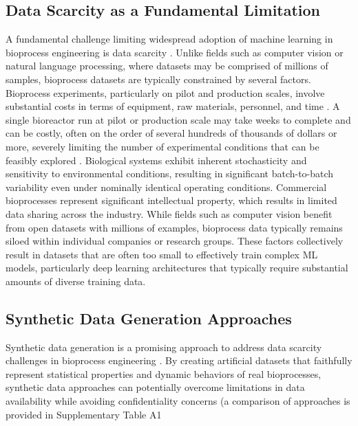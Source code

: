 \documentclass[12pt,twocolumn]{article}
\begin{document}
\subsection{Data Scarcity as a Fundamental Limitation}

A fundamental challenge limiting widespread adoption of machine learning in bioprocess engineering is data scarcity \cite{lim2023opportunities, duongtrung2023when}. Unlike fields such as computer vision or natural language processing, where datasets may be comprised of millions of samples, bioprocess datasets are typically constrained by several factors. Bioprocess experiments, particularly on pilot and production scales, involve substantial costs in terms of equipment, raw materials, personnel, and time \cite{shariatifar2025digital, exploring_hernndezromero_2025}. A single bioreactor run at pilot or production scale may take weeks to complete and can be costly, often on the order of several hundreds of thousands of dollars or more, severely limiting the number of experimental conditions that can be feasibly explored \cite{exploring_hernndezromero_2025}. Biological systems exhibit inherent stochasticity and sensitivity to environmental conditions, resulting in significant batch-to-batch variability even under nominally identical operating conditions. Commercial bioprocesses represent significant intellectual property, which results in limited data sharing across the industry. While fields such as computer vision benefit from open datasets with millions of examples, bioprocess data typically remains siloed within individual companies or research groups. These factors collectively result in datasets that are often too small to effectively train complex ML models, particularly deep learning architectures that typically require substantial amounts of diverse training data.

\subsection{Synthetic Data Generation Approaches}

Synthetic data generation is a promising approach to address data scarcity challenges in bioprocess engineering \cite{liu2024bestpracticeslessonslearned}. By creating artificial datasets that faithfully represent statistical properties and dynamic behaviors of real bioprocesses, synthetic data approaches can potentially overcome limitations in data availability while avoiding confidentiality concerns (a comparison of approaches is provided in Supplementary Table A1 %
\end{document}
